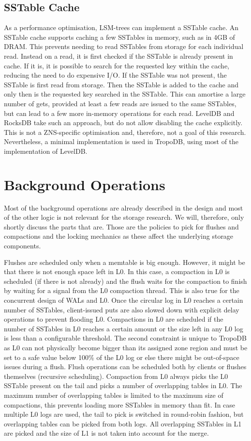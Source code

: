 \subsection{SSTable Cache}
As a performance optimisation, LSM-trees can implement a SSTable cache. An SSTable cache supports caching a few SSTables in memory, such as in 4GB of DRAM. This prevents needing to read SSTables from storage for each individual read. Instead on a read, it is first checked if the SSTable is already present in cache. If it is, it is possible to search for the requested key within the cache, reducing the need to do expensive I/O. If the SSTable was not present, the SSTable is first read from storage. Then the SSTable is added to the cache and only then is the requested key searched in the SSTable. This can amortise a large number of gets, provided at least a few reads are issued to the same SSTables, but can lead to a few more in-memory operations for each read. LevelDB and RocksDB take such an approach, but do not allow disabling the cache explicitly. This is not a ZNS-specific optimisation and, therefore, not a goal of this research. Nevertheless, a minimal implementation is used in TropoDB, using most of the implementation of LevelDB. 


\section{Background Operations}
Most of the background operations are already described in the design and most of the other logic is not relevant for the storage research. We will, therefore, only shortly discuss the parts that are. Those are the policies to pick for flushes and compactions and the locking mechanics as these affect the underlying storage components.

Flushes are scheduled only when a memtable is big enough. However, it might be that there is not enough space left in L0. In this case, a compaction in L0 is scheduled (if there is not already) and the flush waits for the compaction to finish by waiting for a signal from the L0 compaction thread. This is also true for the concurrent design of WALs and L0.  Once the circular log in L0 reaches a certain number of SSTables, client-issued puts are also slowed down with explicit delay operations to prevent flooding L0. Compactions in L0 are scheduled if the number of SSTables in L0 reaches a certain amount or the size left in any L0 log is less than a configurable threshold. The second constraint is unique to TropoDB as L0 can not physically become bigger than its assigned zone region and must be set to a safe value below 100\% of the L0 log or else there might be out-of-space issues during a flush. Flush operations can be scheduled both by clients or flushes themselves (recursive scheduling). Compaction from L0 always picks the L0 SSTable present on the tail and picks a number of overlapping tables in L0. The maximum number of overlapping tables is limited to the maximum size of compactions, this prevents loading more SSTables in memory than fit. In case multiple L0 logs are used, the tail to pick is switched in round-robin fashion, but overlapping tables can be picked from both logs. All overlapping SSTables in L1 are picked and the size of L1 is not taken into account for the merge.

